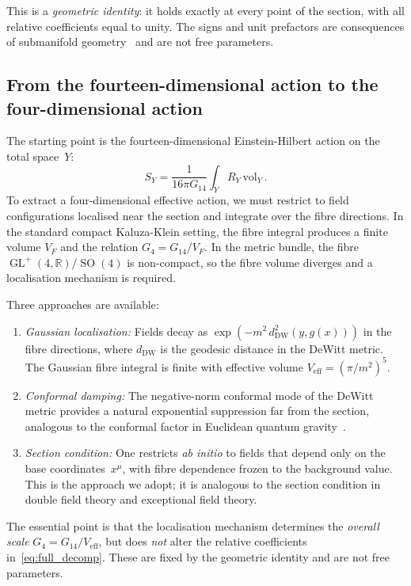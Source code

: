 \documentclass[12pt,a4paper]{article}
\theoremstyle{definition}
\newcommand{\GL}{\operatorname{GL}}
\newcommand{\SO}{\operatorname{SO}}
\newcommand{\R}{\mathbb{R}}
\begin{document}
This is a \emph{geometric identity}: it holds exactly at every point of the section, with all relative coefficients equal to unity.
The signs and unit prefactors are consequences of submanifold geometry~\cite{KobayashiNomizu} and are not free parameters.

\subsection{From the fourteen-dimensional action to the four-dimensional action}

The starting point is the fourteen-dimensional Einstein-Hilbert action on the total space~$Y$:
\begin{equation}
\label{eq:14d_EH}
S_Y = \frac{1}{16\pi G_{14}} \int_Y R_Y\, \mathrm{vol}_Y\,.
\end{equation}
To extract a four-dimensional effective action, we must restrict to field configurations localised near the section and integrate over the fibre directions.
In the standard compact Kaluza-Klein setting, the fibre integral produces a finite volume $V_F$ and the relation $G_4 = G_{14}/V_F$.
In the metric bundle, the fibre $\GL^+(4,\R)/\SO(4)$ is non-compact, so the fibre volume diverges and a localisation mechanism is required.

Three approaches are available:
\begin{enumerate}[nosep, label=(\alph*)]
\item \emph{Gaussian localisation:} Fields decay as $\exp(-m^2\, d^2_{\mathrm{DW}}(y, g(x)))$ in the fibre directions, where $d_{\mathrm{DW}}$ is the geodesic distance in the DeWitt metric.
The Gaussian fibre integral is finite with effective volume $V_{\mathrm{eff}} = (\pi/m^2)^{5}$.

\item \emph{Conformal damping:} The negative-norm conformal mode of the DeWitt metric provides a natural exponential suppression far from the section, analogous to the conformal factor in Euclidean quantum gravity~\cite{Giulini2009}.

\item \emph{Section condition:} One restricts \emph{ab initio} to fields that depend only on the base coordinates~$x^\mu$, with fibre dependence frozen to the background value.
This is the approach we adopt; it is analogous to the section condition in double field theory and exceptional field theory.
\end{enumerate}

The essential point is that the localisation mechanism determines the \emph{overall scale} $G_4 = G_{14}/V_{\mathrm{eff}}$, but does \emph{not} alter the relative coefficients in~\eqref{eq:full_decomp}.
These are fixed by the geometric identity and are not free parameters.
\end{document}
